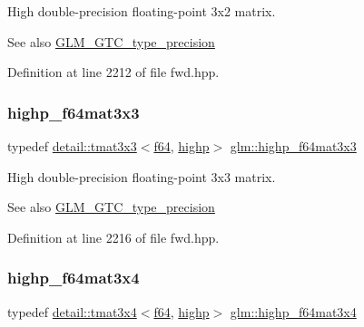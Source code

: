 High double-\/precision floating-\/point 3x2 matrix. \begin{DoxySeeAlso}{See also}
\hyperlink{group__gtc__type__precision}{G\+L\+M\+\_\+\+G\+T\+C\+\_\+type\+\_\+precision} 
\end{DoxySeeAlso}


Definition at line 2212 of file fwd.\+hpp.

\mbox{\label{group__gtc__type__precision_gaf520a9307867c632408029a53af3e375}} 
\subsubsection{\texorpdfstring{highp\+\_\+f64mat3x3}{highp\_f64mat3x3}}
{\footnotesize\ttfamily typedef \hyperlink{structglm_1_1detail_1_1tmat3x3}{detail\+::tmat3x3}$<$\hyperlink{group__gtc__type__precision_ga2bba392e555124b36cde6abba349bab3}{f64}, \hyperlink{namespaceglm_a0f04f086094c747d227af4425893f545ac6f7eab42eacbb10d59a58e95e362074}{highp}$>$ \hyperlink{group__gtc__type__precision_gaf520a9307867c632408029a53af3e375}{glm\+::highp\+\_\+f64mat3x3}}

High double-\/precision floating-\/point 3x3 matrix. \begin{DoxySeeAlso}{See also}
\hyperlink{group__gtc__type__precision}{G\+L\+M\+\_\+\+G\+T\+C\+\_\+type\+\_\+precision} 
\end{DoxySeeAlso}


Definition at line 2216 of file fwd.\+hpp.

\mbox{\label{group__gtc__type__precision_ga4144f547189dd7e52b4dd282f41a1cd1}} 
\subsubsection{\texorpdfstring{highp\+\_\+f64mat3x4}{highp\_f64mat3x4}}
{\footnotesize\ttfamily typedef \hyperlink{structglm_1_1detail_1_1tmat3x4}{detail\+::tmat3x4}$<$\hyperlink{group__gtc__type__precision_ga2bba392e555124b36cde6abba349bab3}{f64}, \hyperlink{namespaceglm_a0f04f086094c747d227af4425893f545ac6f7eab42eacbb10d59a58e95e362074}{highp}$>$ \hyperlink{group__gtc__type__precision_ga4144f547189dd7e52b4dd282f41a1cd1}{glm\+::highp\+\_\+f64mat3x4}}


